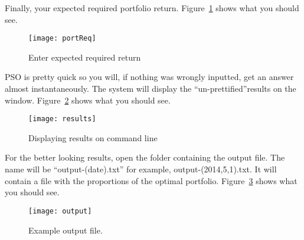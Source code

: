 Finally, your expected required portfolio return. Figure~\ref{fig:portReq} shows what you should see. 
\begin{figure}[H]
  \centering
    \texttt{[image: portReq]}
  \caption{Enter expected required return}
  \label{fig:portReq}
\end{figure} 
PSO is pretty quick so you will, if nothing was wrongly inputted, get an answer almost instantaneously. The system will display the ``un-prettified''results on the window. Figure~\ref{fig:results} shows what you should see. 
\begin{figure}[H]
  \centering
    \texttt{[image: results]}
  \caption{Displaying results on command line}
  \label{fig:results}
\end{figure}
For the better looking results, open the folder containing the output file. The name will be ``output-(date).txt'' for example, output-(2014,5,1).txt. It will contain a file with the proportions of the optimal portfolio. Figure~\ref{fig:output} shows what you should see. 
\begin{figure}[H]
  \centering
    \texttt{[image: output]}
  \caption{Example output file.}
  \label{fig:output}
\end{figure}
